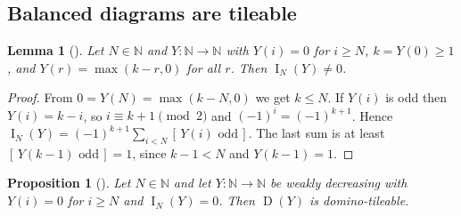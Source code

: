\documentclass[11pt]{amsart}
\theoremstyle{plain}
\newtheorem{lemma}[theorem]{Lemma}
\newtheorem{proposition}[theorem]{Proposition}
\theoremstyle{definition}
\newcommand{\N}{\mathbb{N}}
\newcommand{\ind}[1]{[\,#1\,]}
\newcommand{\imb}{\operatorname{I}}
\newcommand{\sh}{\operatorname{D}}
\begin{document}
\subsection{Balanced diagrams are tileable}

\begin{lemma}[]\label{lem:stair}
Let $N\in\N$ and $Y\colon\N\to\N$ with $Y(i)=0$ for $i\ge N$, $k=Y(0)\ge1$, and $Y(r)=\max(k-r,0)$ for all $r$. Then $\imb_N(Y)\ne0$.
\end{lemma}

\begin{proof}
From $0=Y(N)=\max(k-N,0)$ we get $k\le N$. If $Y(i)$ is odd then $Y(i)=k-i$, so $i\equiv k+1\pmod 2$ and $(-1)^i=(-1)^{k+1}$. Hence $\imb_N(Y)=(-1)^{k+1}\sum_{i<N}\ind{Y(i)\text{ odd}}$. The last sum is at least $\ind{Y(k-1)\text{ odd}}=1$, since $k-1<N$ and $Y(k-1)=1$.
\end{proof}

\begin{proposition}[]\label{prop:bwd}
Let $N\in\N$ and let $Y\colon\N\to\N$ be weakly decreasing with $Y(i)=0$ for $i\ge N$ and $\imb_N(Y)=0$. Then $\sh(Y)$ is domino-tileable.
\end{proposition}
\end{document}
